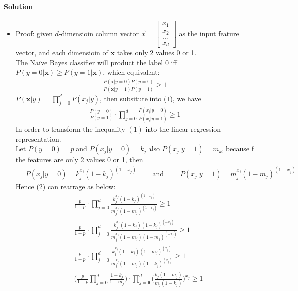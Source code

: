 \documentclass[a4paper]{scrartcl}
\begin{document}
\paragraph{Solution}
\begin{itemize}
  \item Proof: given $d$-dimensioin column vector
$\vec{x}= \begin{bmatrix} x_1 \\ x_2 \\ ... \\ x_d \end{bmatrix}$ as the input feature vector, and each dimensioin of $\textbf{x}$ takes only 2 values 0 or 1.\\
The Na\"ive Bayes classifier will product the label 0 iff $P(y=0|\textbf{x}) \geq P(y=1|\textbf{x})$, which equivalent:
\begin{align}
  \frac{P(\textbf{x}|y=0)P(y=0)}{P(\textbf{x}|y=1)P(y=1)} \geq 1
\end{align}
 ${\displaystyle P(\textbf{x}|y)=\prod_{j=0}^{d} P(x_j|y)}$, then subsitute into (1), we have
\begin{align}
\frac{P(y=0)}{P(y=1)} \cdot {\displaystyle \prod_{j=0}^{d}} \frac{P(x_j|y=0)}{P(x_j|y=1)} \geq 1
\end{align}
In order to transform the inequality $(1)$ into the linear regression representation.\\
Let $P(y=0)=p$ and $P(x_j|y=0)=k_j$ also $P(x_j|y=1)=m_k$, because f the features are only 2 values 0 or 1, then
\begin{align*}
 & \ P(x_j|y=0)= k_j^{x_j}(1-k_j)^{(1-x_j)}\qquad \text{ and }\qquad P(x_j|y=1)= m_j^{x_j}(1-m_j)^{(1-x_j)}
\end{align*}
Hence (2) can rearrage as below:
\begin{align*}
 &\ \frac{p}{1-p} \cdot {\displaystyle \prod_{j=0}^{d}} \frac{k_j^{x_j}(1-k_j)^{(1-x_j)}}{m_j^{x_j}(1-m_j)^{(1-x_j)}} \geq 1\\
 &\ \frac{p}{1-p} \cdot {\displaystyle \prod_{j=0}^{d}} \frac{k_j^{x_j}(1-k_j)(1-k_j)^{(-x_j)}}{m_j^{x_j}(1-m_j)(1-m_j)^{(-x_j)}} \geq 1\\
 &\ \frac{p}{1-p} \cdot {\displaystyle \prod_{j=0}^{d}} \frac{k_j^{x_j}(1-k_j)(1-m_j)^{(x_j)}}{m_j^{x_j}(1-m_j)(1-k_j)^{(x_j)}} \geq 1\\
 &\ \Bigg(\frac{p}{1-p} {\displaystyle \prod_{j=0}^{d}} \frac{1-k_j}{1-m_j}\Bigg) \cdot {\displaystyle \prod_{j=0}^{d}} \Bigg(\frac{k_j(1-m_j)}{m_j(1-k_j)}\Bigg)^{x_j} \geq 1
\end{align*}

\end{itemize}
\end{document}
